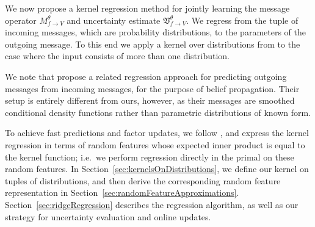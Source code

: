 \documentclass[english]{article}
\theoremstyle{plain}
\theoremstyle{plain}
\newcommand{\factor}{f}				%
\newcommand{\outV}{V}                         %
\newcommand{\approxMsg}[3]{M_{#1 \rightarrow #2}^{#3}}			%
\newcommand{\uncertaintyMsg}[3]{{\mathfrak V}_{#1 \rightarrow #2}^{#3}}			%
\newcommand{\secref}[1]{Section~\ref{#1}}
\begin{document}
We now propose a kernel regression method for jointly learning the message operator $\approxMsg{\factor}{\outV}{\theta}$ and
uncertainty estimate $\uncertaintyMsg{\factor}{\outV}{\theta}$. We regress from the tuple of incoming messages, which
are probability distributions, to the parameters of the outgoing message. 
To this end we apply a kernel over distributions from \citep{Christmann2010} 
to the case where the input consists of more than one distribution.

We note that \citet{SonGreGue10,SonGreBicLowGue11} propose a related regression approach for predicting outgoing
messages from incoming messages, for the purpose of belief propagation. 
Their setup is entirely different from ours, however, as their messages are smoothed conditional density functions rather than parametric distributions of known form.

To achieve fast predictions and factor updates, we follow
\citet{Rahimi2007,Le2013,YanSmoZonWil14}, and express the kernel regression in
terms of random features whose expected inner product
is equal to the kernel function; i.e.\ we perform regression directly in the primal on these random features.
In \secref{sec:kernelsOnDistributions}, we define our kernel on tuples of distributions, and then derive the corresponding random feature representation in 
\secref{sec:randomFeatureApproximations}. \secref{sec:ridgeRegression} describes the regression algorithm, as well as our strategy for uncertainty evaluation and online updates.
\end{document}
